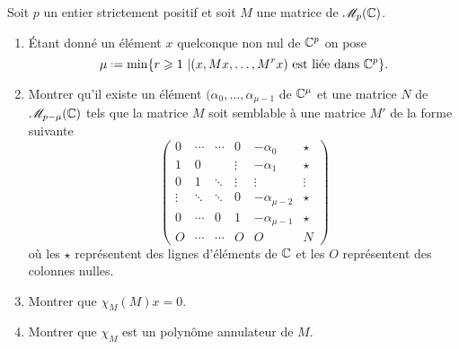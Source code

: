 \begin{exercice}
    Soit $p$ un entier strictement positif et soit $M$ une matrice de $\mathscr{M}_p(\mathbb{C})$.
    \begin{enumerate}
        \item Étant donné un élément $x$ quelconque non nul de $\mathbb{C}^p$ on pose
        $$\mu \defeq \min \{ r \geqslant 1\ | (x, Mx, \dots, M^r x) \text{ est liée dans } \C^p\}.$$
        \item Montrer qu'il existe un élément $(\alpha_0, \dots, \alpha_{\mu-1}$ de $\mathbb{C}^{\mu}$ et une matrice $N$ de $\mathscr{M}_{p-\mu}(\mathbb{C})$ tels que la matrice $M$ soit semblable à une matrice $M'$ de la forme suivante
        $$
        \begin{pmatrix}
        0 & \cdots & \cdots & 0 & -\alpha_0 & \star \\
        1 & 0 & & \vdots & -\alpha_1 & \star \\
        0 & 1 & \ddots & \vdots & \vdots & \vdots \\
        \vdots & \ddots & \ddots & 0 & -\alpha_{\mu-2} & \star \\
        0 & \cdots & 0 & 1 & -\alpha_{\mu-1} & \star \\
        O & \cdots & \cdots & O & O & N
        \end{pmatrix}
        $$
        où les $\star$ représentent des lignes d'éléments de $\mathbb{C}$ et les $O$ représentent des colonnes nulles. 
        \item Montrer que $\chi_M(M)x = 0$.
        \item Montrer que $\chi_M$ est un polynôme annulateur de $M$.
    \end{enumerate}
\end{exercice}

\begin{preuve}
\end{preuve}
